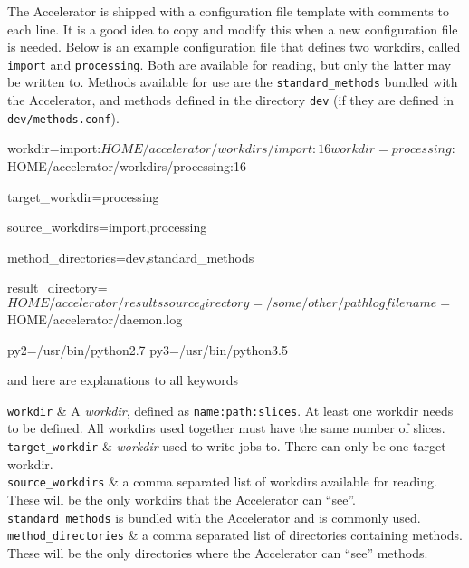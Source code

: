 The Accelerator is shipped with a configuration file template with
comments to each line.  It is a good idea to copy and modify this when
a new configuration file is needed.  Below is an example configuration
file that defines two workdirs, called \texttt{import} and
\texttt{processing}.  Both are available for reading, but only the
latter may be written to.  Methods available for use are the
\texttt{standard\_methods} bundled with the Accelerator, and methods
defined in the directory \texttt{dev} (if they are defined in
\texttt{dev/methods.conf}).
\begin{leftbar}
\begin{shell}
workdir=import:${HOME}/accelerator/workdirs/import:16
workdir=processing:${HOME}/accelerator/workdirs/processing:16

target_workdir=processing

source_workdirs=import,processing

method_directories=dev,standard_methods

result_directory=${HOME}/accelerator/results

source_directory=/some/other/path

logfilename=${HOME}/accelerator/daemon.log

py2=/usr/bin/python2.7
py3=/usr/bin/python3.5
\end{shell}
\end{leftbar}
\noindent and here are explanations to all keywords
\starttabletwo

\RPtwo \texttt{workdir} & A \textsl{workdir}, defined as
\texttt{name:path:slices}.  At least one workdir needs to be defined.
All workdirs used together must have the same number of slices.\\[1ex]

\RPtwo \texttt{target\_workdir} & \textsl{workdir} used to
write jobs to.  There can only be one target workdir.\\[1ex]

\RPtwo \texttt{source\_workdirs} & a comma separated list of workdirs
available for reading.  These will be the only workdirs that the
Accelerator can ``see''.  \texttt{standard\_methods} is bundled with
the Accelerator and is commonly used.\\[1ex]

\RPtwo \texttt{method\_directories} & a comma separated list of
directories containing methods.  These will be the only directories
where the Accelerator can ``see'' methods.\\[1ex]

